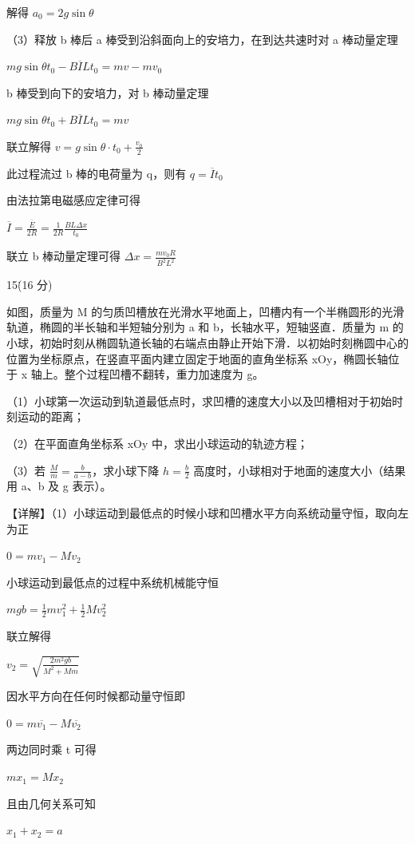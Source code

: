 \documentclass[\gkver]{gaokaozhenti}
\begin{document}
\begin{enumerate}
{解得  $a_{0}=2g\sin\theta$

（3）释放 b 棒后 a 棒受到沿斜面向上的安培力，在到达共速时对 a 棒动量定理

 $mg\sin\theta t_{0}-B\overline{I}L t_{0}=mv-mv_{0}$

b 棒受到向下的安培力，对 b 棒动量定理

 $mg\sin\theta t_{0}+B\overline{I}L t_{0}=mv$

联立解得  $v = g \sin \theta \cdot t_{0} + \frac{v_{0}}{2}$

此过程流过 b 棒的电荷量为 q，则有  $q = \overline{I} t_{0}$

由法拉第电磁感应定律可得

 $\overline{I}=\frac{\overline{E}}{2R}=\frac{1}{2R}\frac{BL\Delta x}{t_{0}}$

联立 b 棒动量定理可得  $\Delta x = \frac{mv_{0}R}{B^{2}L^{2}}$

15\. (16 分)

如图，质量为 M 的匀质凹槽放在光滑水平地面上，凹槽内有一个半椭圆形的光滑轨道，椭圆的半长轴和半短轴分别为 a 和 b，长轴水平，短轴竖直．质量为 m 的小球，初始时刻从椭圆轨道长轴的右端点由静止开始下滑．以初始时刻椭圆中心的位置为坐标原点，在竖直平面内建立固定于地面的直角坐标系 xOy，椭圆长轴位于 x 轴上。整个过程凹槽不翻转，重力加速度为 g。

（1）小球第一次运动到轨道最低点时，求凹槽的速度大小以及凹槽相对于初始时刻运动的距离；

（2）在平面直角坐标系 xOy 中，求出小球运动的轨迹方程；

（3）若  $\frac{M}{m} = \frac{b}{a - b}$，求小球下降  $h = \frac{b}{2}$ 高度时，小球相对于地面的速度大小（结果用 a、b 及 g 表示）。

【详解】（1）小球运动到最低点的时候小球和凹槽水平方向系统动量守恒，取向左为正

 $0 = mv_{1} - Mv_{2}$

小球运动到最低点的过程中系统机械能守恒

 $mgb = \frac{1}{2}mv_{1}^{2} + \frac{1}{2}Mv_{2}^{2}$

联立解得

 $v_{2} = \sqrt{\frac{2m^{2}gb}{M^{2} + Mm}}$

因水平方向在任何时候都动量守恒即

 $0 = m\overline{v_{1}} - M\overline{v_{2}}$

两边同时乘 t 可得

 $mx_{1} = Mx_{2}$

且由几何关系可知

 $x_{1} + x_{2} = a$

}
\end{enumerate}
\end{document}
